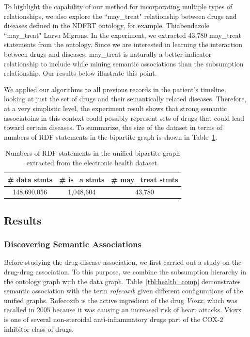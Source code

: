 To highlight the capability of our method for incorporating multiple types of relationships, we also explore the ``may\_treat" relationship between drugs and diseases defined in the NDFRT ontology, for example, Thiabendazole ``may\_treat" Larva Migrans. In the experiment, we extracted 43,780 may\_treat statements from the ontology. Since we are interested in learning the interaction between drugs and diseases, may\_treat is naturally a better indicator relationship to include while mining semantic associations than the subsumption relationship. Our results below illustrate this point.

We applied our algorithms to all previous records in the patient's timeline, looking at just the set of drugs and their semantically related diseases. Therefore, at a very simplistic level, the experiment result shows that strong semantic associatoins in this context could possibly represent sets of drugs that could lead toward certain diseases. To summarize, the size of the dataset in terms of numbers of RDF statements in the bipartite graph is shown in Table~\ref{tbl:exp_overview}.


\begin{table}[tbh]\scriptsize
\begin{center}
\begin{tabular}{c|c|c}
\hline
  \# data stmts & \# is\_a stmts & \# may\_treat stmts \\
  \hline
  148,690,056  & 1,048,604 &    43,780\\
  \hline
\end{tabular}
\end{center}
\caption{\label{tbl:exp_overview} Numbers of RDF statements in the unified bipartite graph extracted from the electronic health dataset. }
\end{table}


\subsection{Results}
\subsubsection{Discovering Semantic Associations}
Before studying the drug-disease association, we first carried out a study on the drug-drug association. To this purpose, we combine the subsumption hierarchy in the ontology graph with the data graph. Table~\ref{tbl:health_comp} demonstrates semantic association with the term \emph{rofecoxib} given different configurations of the unified graphs. Rofecoxib is the active ingredient of the drug \emph{Vioxx}, which was recalled in 2005 because it was causing an increased risk of heart attacks. Vioxx is one of several non-steroidal anti-inflammatory drugs part of the COX-2 inhibitor class of drugs.

